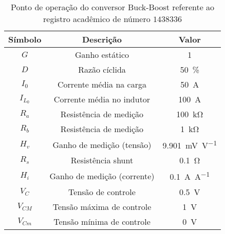 \begin{table}[!ht]
\centering
\caption{Ponto de operação do conversor Buck-Boost referente ao registro acadêmico de número $1438336$}
\label{tab:steadystate}
\begin{tabular}{@{}ccc@{}}
\toprule
\textbf{Símbolo} & \textbf{Descrição} & \textbf{Valor}\\ \midrule
$G$ & Ganho estático & \SI{1}{}\\
$D$ & Razão cíclida  & \SI{50}{\%}\\
$I_0$ & Corrente média na carga  & \SI{50}{\A} \\
$I_{L_0}$ & Corrente média no indutor & \SI{100}{\A} \\
$R_a$ & Resistência de medição & \SI{100}{\kilo\ohm} \\
$R_b$ & Resistência de medição & \SI{1}{\kilo\ohm} \\
$H_v$ & Ganho de medição (tensão) & \SI{9.901}{\milli\V\per\V} \\
$R_s$ & Resistência shunt & \SI{0.1}{\ohm} \\
$H_i$ & Ganho de medição (corrente) & \SI{0.1}{\A\per\A} \\
$V_C$ & Tensão de controle  & \SI{0.5}{\V} \\
$V_{CM}$ & Tensão máxima de controle  & \SI{1}{\V} \\
$V_{Cm}$ & Tensão mínima de controle  & \SI{0}{\V} \\
\bottomrule
\end{tabular}
\end{table}

